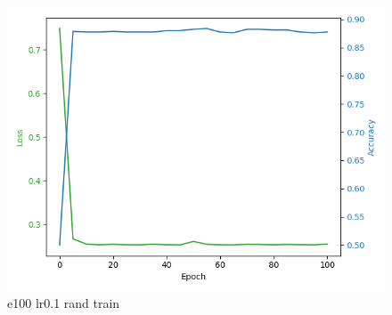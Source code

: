 \documentclass[8pt]{article}
\begin{document}
\begin{figure}[H]
    \begin{minipage}{0.32\textwidth}
        \centering
        \includegraphics[width=\textwidth]{../Prob4/out/1024_173617/e100_lr0.1_btz16_random/training_process.png}
        \caption{e100 lr0.1 rand train}
        \label{fig:e100 lr0.1 rand train}
    \end{minipage}
\end{figure}
\end{document}
